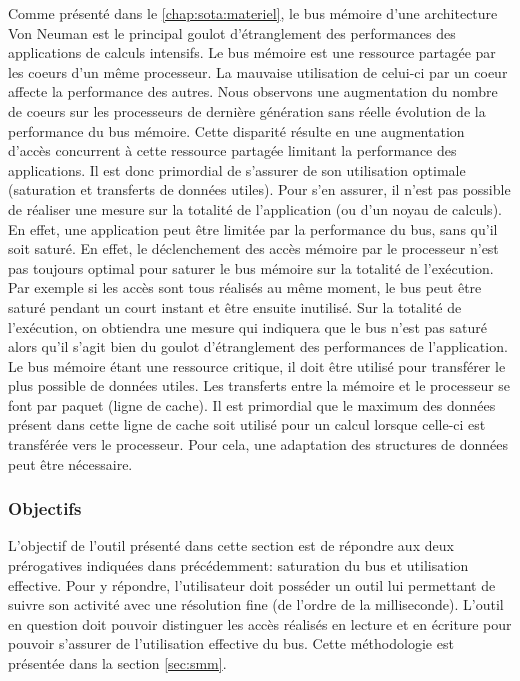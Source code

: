         Comme présenté dans le \autoref{chap:sota:materiel}, le bus mémoire d'une architecture Von Neuman est le principal goulot d'étranglement des performances des applications de calculs intensifs\cite{Drepper2007}. Le bus mémoire est une ressource partagée par les coeurs d'un même processeur. La mauvaise utilisation de celui-ci par un coeur affecte la performance des autres. Nous observons une augmentation du nombre de coeurs sur les processeurs de dernière génération sans réelle évolution de la performance du bus mémoire. Cette disparité résulte en une augmentation d'accès concurrent à cette ressource partagée limitant la performance des applications. Il est donc primordial de s'assurer de son utilisation optimale (saturation et transferts de données utiles). Pour s'en assurer, il n'est pas possible de réaliser une mesure sur la totalité de l'application (ou d'un noyau de calculs). En effet, une application peut être limitée par la performance du bus, sans qu'il soit saturé. En effet, le déclenchement des accès mémoire par le processeur n’est pas toujours optimal pour saturer le bus mémoire sur la totalité de l'exécution. Par exemple si les accès sont tous réalisés au même moment, le bus peut être saturé pendant un court instant et être ensuite inutilisé. Sur la totalité de l'exécution, on obtiendra une mesure qui indiquera que le bus n'est pas saturé alors qu'il s'agit bien du goulot d'étranglement des performances de l'application. Le bus mémoire étant une ressource critique, il doit être utilisé pour transférer le plus possible de données utiles. Les transferts entre la mémoire et le processeur se font  par paquet (ligne de cache). Il est primordial que le maximum des données présent dans cette ligne de cache soit utilisé pour un calcul lorsque celle-ci est transférée vers le processeur. Pour cela, une adaptation des structures de données peut être nécessaire.
    
    \subsubsection{Objectifs}
    
        L'objectif de l'outil présenté dans cette section est de répondre aux deux prérogatives indiquées dans précédemment: saturation du bus et utilisation effective. Pour y répondre, l'utilisateur doit posséder un outil lui permettant de suivre son activité avec une résolution fine (de l'ordre de la milliseconde). L'outil en question doit pouvoir distinguer les accès réalisés en lecture et en écriture pour pouvoir s'assurer de l'utilisation effective du bus. Cette méthodologie est présentée dans la section \autoref{sec:smm}.
        
